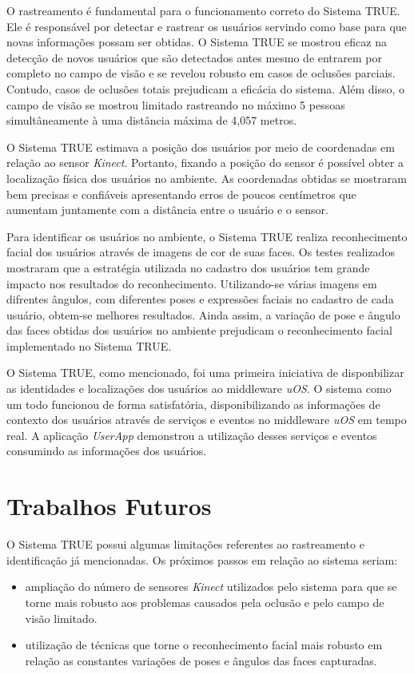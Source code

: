 O rastreamento é fundamental para o funcionamento correto do Sistema TRUE. Ele é responsável por detectar e rastrear os usuários servindo como base para que novas informações possam ser obtidas. O Sistema TRUE se mostrou eficaz na detecção de novos usuários que são detectados antes mesmo de entrarem por completo no campo de visão e se revelou robusto em casos de oclusões parciais. Contudo, casos de oclusões totais prejudicam a eficácia do sistema. Além disso, o campo de visão se mostrou limitado rastreando no máximo 5 pessoas simultâneamente à uma distância máxima de 4,057 metros.

O Sistema TRUE estimava a posição dos usuários por meio de coordenadas em relação ao sensor \textit{Kinect}. Portanto, fixando a posição do sensor é possível obter a localização física dos usuários no ambiente. As coordenadas obtidas se mostraram bem precisas e confiáveis apresentando erros de poucos centímetros que aumentam juntamente com a distância entre o usuário e o sensor. 

Para identificar os usuários no ambiente, o Sistema TRUE realiza reconhecimento facial dos usuários através de imagens de cor de suas faces. Os testes realizados mostraram que a estratégia utilizada no cadastro dos usuários tem grande impacto nos resultados do reconhecimento. Utilizando-se várias imagens em difrentes ângulos, com diferentes poses e expressões faciais no cadastro de cada usuário, obtem-se melhores resultados. Ainda assim, a variação de pose e ângulo das faces obtidas dos usuários no ambiente prejudicam o reconhecimento facial implementado no Sistema TRUE.

O Sistema TRUE, como mencionado, foi uma primeira iniciativa de disponbilizar as identidades e localizações dos usuários ao middleware \textit{uOS}. O sistema como um todo funcionou de forma satisfatória, disponibilizando as informações de contexto dos usuários através de serviços e eventos no middleware \textit{uOS} em tempo real. A aplicação \textit{UserApp} demonstrou a utilização desses serviços e eventos consumindo as informações dos usuários.

\section{Trabalhos Futuros}

O Sistema TRUE possui algumas limitações referentes ao rastreamento e identificação já mencionadas. Os próximos passos em relação ao sistema seriam:

\begin{itemize}
	\item ampliação do número de sensores \textit{Kinect} utilizados pelo sistema para que se torne mais robusto aos problemas causados pela oclusão e pelo campo de visão limitado.
	\item utilização de técnicas que torne o reconhecimento facial mais robusto em relação as constantes variações de poses e ângulos das faces capturadas.
\end{itemize}




